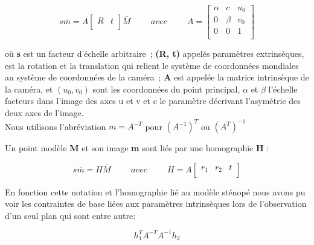  
 \begin{equation}
 s\bar{m}= A\left[ 
 \begin{array}{cc}
 	R & t \\
 \end{array} \right]\bar{M}
 \hspace{1cm} 
  avec 
  \hspace{1cm} 
  A
  =
  \left[ 
  \begin{array}{ccc}
  	\alpha & c & u_0 \\
  	0 & \beta & v_0\\
  	0 & 0 & 1 \\
  \end{array} \right] 
  \label{eq:notation}
\end{equation}
   
   
 
 où \textbf{s} est un facteur d'échelle arbitraire ; \textbf{(R, t)} appelés paramètres extrinsèques, est la rotation et la translation qui relient le système de coordonnées mondiales au système de coordonnées de la caméra ; \textbf{A} est appelée la matrice intrinsèque de la caméra, et $(u_0, v_0)$ sont les coordonnées du point principal, $\alpha$ et $\beta $  l'échelle facteurs dans l'image des axes u et v et c le paramètre décrivant l'asymétrie des deux axes de l'image.\\
 Nous utilisons l'abréviation $m = A^{-T}$ pour
 $(A^{-1})^{T}$ ou $(A^{T})^{-1}$
 
  Un point modèle \textbf{M} et son image \textbf{m} sont liés par une homographie \textbf{H} :
  
\begin{equation} 
 s\bar{m}=H\bar{M}
 \hspace{1cm} 
 avec
 \hspace{1cm} 
 H=A
 \left[ 
 \begin{array}{ccc}
 	r_1 & r_2 & t\\
 \end{array} \right]
 \label{eq:homographie}
\end{equation}
 
 
 
 En fonction cette notation et  l'homographie lié au modèle sténopé nous avons pu voir les contraintes de base liées aux paramètres intrinsèques lors de l'observation d'un seul plan qui sont entre autre:  
 
 \begin{equation} 
 h_{1}^{T} 
 A^{-T}
 A^{-1}
 h_2
 \label{eq:contrainte1}
 \end{equation}
 
